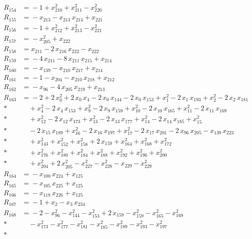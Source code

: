 \begin{align*}
R_{154} &={} -1 +x_{210}^{2} +x_{211}^{2} -x_{220}^{2} \\[3pt]
R_{155} &={} -x_{213} -x_{213}\,x_{214} +x_{221} \\[3pt]
R_{156} &={} -1 +x_{212}^{2} +x_{213}^{2} -x_{221}^{2} \\[3pt]
R_{157} &={} -x_{205}^{2} +x_{222} \\[3pt]
R_{158} &={} x_{211} -2\,x_{216}\,x_{222} -x_{222} \\[3pt]
R_{159} &={} -4\,x_{211} -8\,x_{211}\,x_{215} +x_{214} \\[3pt]
R_{160} &={} -x_{139} -x_{210}\,x_{217} +x_{214} \\[3pt]
R_{161} &={} -1 -x_{204} -x_{210}\,x_{218} +x_{212} \\[3pt]
R_{162} &={} -x_{96} -4\,x_{205}\,x_{219} +x_{213} \\[3pt]
R_{163} &={} -2 +2\,x_{0}^{2} +2\,x_{0}\,x_{4} -2\,x_{0}\,x_{144} -2\,x_{0}\,x_{153} +x_{1}^{2} -2\,x_{1}\,x_{193} +x_{2}^{2} -2\,x_{2}\,x_{181} \\*
&\quad{} +x_{4}^{2} -2\,x_{4}\,x_{153} +x_{9}^{2} -2\,x_{9}\,x_{159} +x_{10}^{2} -2\,x_{10}\,x_{165} +x_{11}^{2} -2\,x_{11}\,x_{169} \\*
&\quad{} +x_{12}^{2} -2\,x_{12}\,x_{173} +x_{13}^{2} -2\,x_{13}\,x_{177} +x_{14}^{2} -2\,x_{14}\,x_{185} +x_{15}^{2} \\*
&\quad{} -2\,x_{15}\,x_{189} +x_{16}^{2} -2\,x_{16}\,x_{197} +x_{17}^{2} -2\,x_{17}\,x_{201} -2\,x_{96}\,x_{205} -x_{139}\,x_{223} \\*
&\quad{} +x_{143}^{2} +x_{152}^{2} +x_{158}^{2} +2\,x_{159} +x_{164}^{2} +x_{168}^{2} +x_{172}^{2} \\*
&\quad{} +x_{176}^{2} +x_{180}^{2} +x_{184}^{2} +x_{188}^{2} +x_{192}^{2} +x_{196}^{2} +x_{200}^{2} \\*
&\quad{} +x_{204}^{2} +2\,x_{205}^{2} -x_{227}^{2} -x_{228}^{2} -x_{229} -x_{229}^{2} \\[3pt]
R_{164} &={} -x_{100}\,x_{224} +x_{125} \\[3pt]
R_{165} &={} -x_{105}\,x_{225} +x_{125} \\[3pt]
R_{166} &={} -x_{118}\,x_{226} +x_{125} \\[3pt]
R_{167} &={} -1 +x_{2} -x_{3}\,x_{234} \\[3pt]
R_{168} &={} -2 -x_{96}^{2} -x_{144}^{2} -x_{153}^{2} +2\,x_{159} -x_{159}^{2} -x_{165}^{2} -x_{169}^{2} \\*
&\quad{} -x_{173}^{2} -x_{177}^{2} -x_{181}^{2} -x_{185}^{2} -x_{189}^{2} -x_{193}^{2} -x_{197}^{2} \\*

\end{align*}
